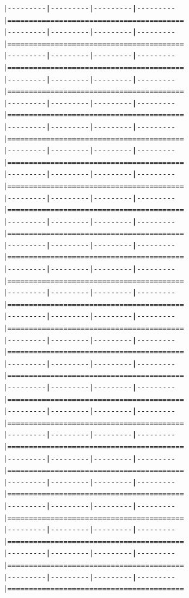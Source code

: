 \documentclass[
]{article}
\begin{document}
\begin{verbatim}
|---------|---------|---------|---------|=========================================                                          |---------|---------|---------|---------|=========================================                                          |---------|---------|---------|---------|=========================================                                          |---------|---------|---------|---------|=========================================                                          |---------|---------|---------|---------|=========================================                                          |---------|---------|---------|---------|=========================================                                          |---------|---------|---------|---------|=========================================                                          |---------|---------|---------|---------|=========================================                                          |---------|---------|---------|---------|=========================================                                          |---------|---------|---------|---------|=========================================                                          |---------|---------|---------|---------|=========================================                                          |---------|---------|---------|---------|=========================================                                          |---------|---------|---------|---------|=========================================                                          |---------|---------|---------|---------|=========================================                                          |---------|---------|---------|---------|=========================================                                          |---------|---------|---------|---------|=========================================                                          |---------|---------|---------|---------|=========================================                                          |---------|---------|---------|---------|=========================================                                          |---------|---------|---------|---------|=========================================                                          |---------|---------|---------|---------|=========================================                                          |---------|---------|---------|---------|=========================================                                          |---------|---------|---------|---------|=========================================                                          |---------|---------|---------|---------|=========================================                                          |---------|---------|---------|---------|=========================================                                          |---------|---------|---------|---------|=========================================                                          
\end{verbatim}
\end{document}
